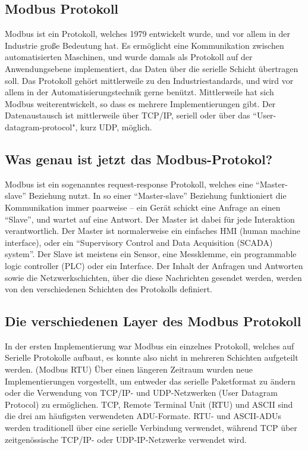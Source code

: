 \subsection{Modbus Protokoll}\label{modbusprotokoll} 

Modbus ist ein Protokoll, welches 1979 entwickelt wurde, und vor allem in der Industrie große Bedeutung hat. Es ermöglicht eine Kommunikation zwischen automatisierten Maschinen, und wurde damals als Protokoll auf der Anwendungsebene implementiert, das Daten über die serielle Schicht übertragen soll. Das Protokoll gehört mittlerweile zu den Industriestandards, und wird vor allem in der Automatisierungstechnik gerne benützt. Mittlerweile hat sich Modbus weiterentwickelt, so dass es mehrere Implementierungen gibt. Der Datenaustausch ist mittlerweile über TCP/IP, seriell oder über das “User-datagram-protocol", kurz UDP, möglich.
\cite{ModbusgrundlagenKubunu} \cite{modbuskubunu}

\subsection{Was genau ist jetzt das Modbus-Protokol?}
Modbus ist ein sogenanntes request-response Protokoll, welches eine “Master-slave” Beziehung nutzt. In so einer “Master-slave” Beziehung funktioniert die Kommunikation immer paarweise – ein Gerät schickt eine Anfrage an einen “Slave”, und wartet auf eine Antwort. Der Master ist dabei für jede Interaktion verantwortlich. Der Master ist normalerweise ein einfaches HMI (human machine interface), oder ein “Supervisory Control and Data Acquisition (SCADA) system”.  Der Slave ist meistens ein Sensor, eine Messklemme, ein programmable logic controller (PLC) oder ein Interface. Der Inhalt der Anfragen und Antworten sowie die Netzwerkschichten, über die diese Nachrichten gesendet werden, werden von den verschiedenen Schichten des Protokolls definiert. 
\cite{modbusoverserial}
\subsection{Die verschiedenen Layer des Modbus Protokoll }
In der ersten Implementierung war Modbus ein einzelnes Protokoll, welches auf Serielle Protokolle aufbaut, es konnte also nicht in mehreren Schichten aufgeteilt werden. (Modbus RTU) 
Über einen längeren Zeitraum wurden neue Implementierungen vorgestellt, um entweder das serielle Paketformat zu ändern oder die Verwendung von TCP/IP- und UDP-Netzwerken (User Datagram Protocol) zu ermöglichen. TCP, Remote Terminal Unit (RTU) und ASCII sind die drei am häufigsten verwendeten ADU-Formate. RTU- und ASCII-ADUs werden traditionell über eine serielle Verbindung verwendet, während TCP über zeitgenössische TCP/IP- oder UDP-IP-Netzwerke verwendet wird. 

